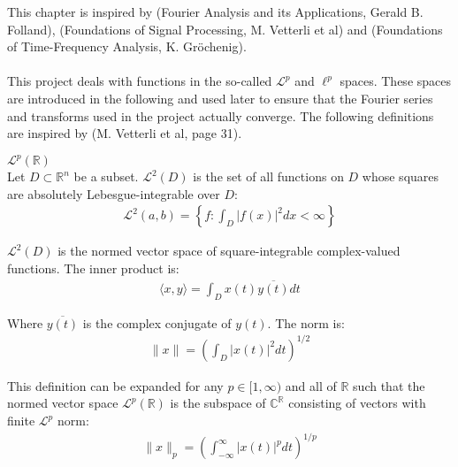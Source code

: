This chapter is inspired by (Fourier Analysis and its Applications, Gerald B. Folland), (Foundations of Signal Processing, M. Vetterli et al) and (Foundations of Time-Frequency Analysis, K. Gröchenig).
\\ \\
This project deals with functions in the so-called $\mathcal{L}^p$ and $\ell^p$ spaces. These spaces are introduced in the following and used later to ensure that the Fourier series and transforms used in the project actually converge. The following definitions are inspired by (M. Vetterli et al, page 31).

\begin{definition}{$\mathcal{L}^p(\mathbb{R})$}
\\
Let $D \subset \mathbb{R}^n$ be a subset. $\mathcal{L}^2(D)$ is the set of all functions on $D$ whose squares are absolutely Lebesgue-integrable over $D$:
\begin{align*}
\mathcal{L}^2(a,b) = \left\{ f: \int_D |f(x)|^2 dx < \infty \right\}
\end{align*}

$\mathcal{L}^2(D)$ is the normed vector space of square-integrable complex-valued functions. The inner product is:
\begin{align*}
\langle x,y \rangle =  \int_D x(t) \overline{y(t)} dt
\end{align*}

Where $\overline{y(t)}$ is the complex conjugate of $y(t)$. The norm is:
\begin{align*}
\|x\| = \left( \int_D |x(t)|^2 dt \right)^{1/2}
\end{align*}

This definition can be expanded for any $p \in [1,\infty)$ and all of $\mathbb{R}$ such that the normed vector space $\mathcal{L}^p(\mathbb{R})$ is the subspace of $\mathbb{C}^\mathbb{R}$ consisting of vectors with finite $\mathcal{L}^p$ norm:
\begin{align*}
\|x\|_p = \left( \int_{-\infty}^\infty |x(t)|^p dt \right)^{1/p}
\end{align*}
\end{definition}

